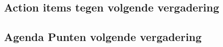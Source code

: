 \subsection{Action items tegen volgende vergadering}
\subsection{Agenda Punten volgende vergadering}

